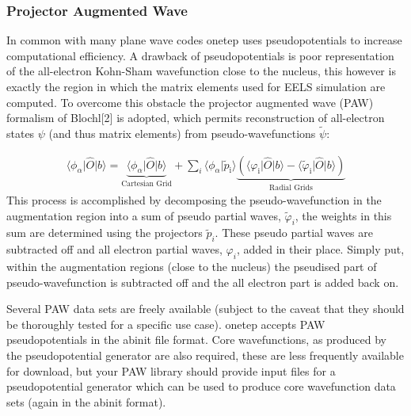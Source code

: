 \documentclass[letterpaper,10pt,english]{sphinxmanual}
\begin{document}
\subsubsection{Projector Augmented Wave}
\label{\detokenize{eels_in_onetep:projector-augmented-wave}}
In common with many plane wave codes onetep uses pseudopotentials to increase
computational efficiency. A drawback of pseudopotentials is poor
representation of the all-electron Kohn-Sham wavefunction close to the nucleus,
this however is exactly the region in which the matrix elements used for EELS
simulation are computed.
To overcome this obstacle the projector augmented wave (PAW) formalism
of Blochl{[}2{]} is adopted, which permits reconstruction of all-electron
states \(\psi\)
(and thus matrix elements) from pseudo-wavefunctions \(\widetilde{\psi}\):

\label{\detokenize{eels_in_onetep:equation-paw-matel}}\begin{equation}\label{equation:eels_in_onetep:paw_matel}
\begin{split}\langle \phi_\alpha \vert \hat{O} \vert b \rangle =
\underbrace{ \langle \phi_\alpha \vert  \hat{O} \vert b\rangle }_\text{Cartesian Grid} +
\sum_{i}\langle \phi_\alpha \vert \widetilde{p}_\text{i}\rangle\underbrace{(\langle \varphi_\text{i} \vert  \hat{O}
\vert b \rangle -
\langle \widetilde{\varphi}_\text{i}
\vert  \hat{O} \vert b \rangle)}_\text{Radial Grids}\end{split}
\end{equation}
This process is accomplished by decomposing the pseudo-wavefunction in
the augmentation region into a sum of pseudo partial waves, \(\widetilde{\varphi}_i\), the weights in
this sum are determined using the projectors \(\widetilde{p}_i\).
These pseudo partial waves are
subtracted off and all electron partial waves, \(\varphi_i\), added in their place.
Simply put, within the augmentation regions (close to the nucleus) the pseudised part
of pseudo-wavefunction is subtracted off and the all electron part is added back
on.

Several PAW data sets are freely available (subject to the caveat that they
should be thoroughly tested for a specific use case). onetep accepts PAW
pseudopotentials in the abinit file format. Core wavefunctions, as produced
by the pseudopotential generator are also required, these are less frequently
available for download, but your PAW library should provide input files for a
pseudopotential generator which can be used to produce core wavefunction data
sets (again in the abinit format).
\end{document}
